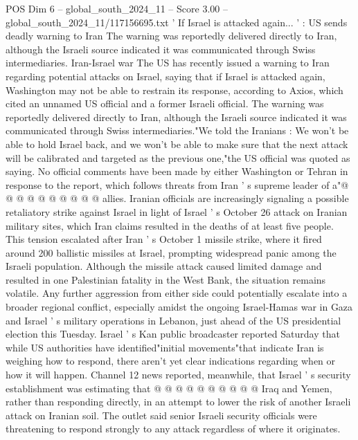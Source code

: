 \begin{textsample}{POS Dim 6 – global\_south\_2024\_11 – Score 3.00 – global\_south\_2024\_11/117156695.txt}  \label{ex:f6_pos_395}
' If Israel is attacked again... ' : US sends deadly warning to Iran The warning was reportedly delivered directly to Iran, although the Israeli source indicated it was communicated through Swiss intermediaries.
Iran-Israel war The US has recently issued a warning to Iran regarding potential attacks on Israel, saying that if Israel is attacked again, Washington may not be able to restrain its response, according to Axios, which cited an unnamed US official and a former Israeli official.
The warning was reportedly delivered directly to Iran, although the Israeli source indicated it was communicated through Swiss intermediaries."We told the Iranians : We won't be able to hold Israel back, and we won't be able to make sure that the next attack will be calibrated and targeted as the previous one,"the US official was quoted as saying.
No official comments have been made by either Washington or Tehran in response to the report, which follows threats from Iran ' s supreme leader of a"@ @ @ @ @ @ @ @ @ @ allies.
Iranian officials are increasingly signaling a possible retaliatory strike against Israel in light of Israel ' s October 26 attack on Iranian military sites, which Iran claims resulted in the deaths of at least five people.
This tension escalated after Iran ' s October 1 missile strike, where it fired around 200 ballistic missiles at Israel, prompting widespread panic among the Israeli population.
Although the missile attack caused limited damage and resulted in one Palestinian fatality in the West Bank, the situation remains volatile.
Any further aggression from either side could potentially escalate into a broader regional conflict, especially amidst the ongoing Israel-Hamas war in Gaza and Israel ' s military operations in Lebanon, just ahead of the US presidential election this Tuesday.
Israel ' s Kan public broadcaster reported Saturday that while US authorities have identified"initial movements"that indicate Iran is weighing how to respond, there aren't yet clear indications regarding when or how it will happen.
Channel 12 news reported, meanwhile, that Israel ' s security establishment was estimating that @ @ @ @ @ @ @ @ @ @ Iraq and Yemen, rather than responding directly, in an attempt to lower the risk of another Israeli attack on Iranian soil.
The outlet said senior Israeli security officials were threatening to respond strongly to any attack regardless of where it originates.

\end{textsample}
